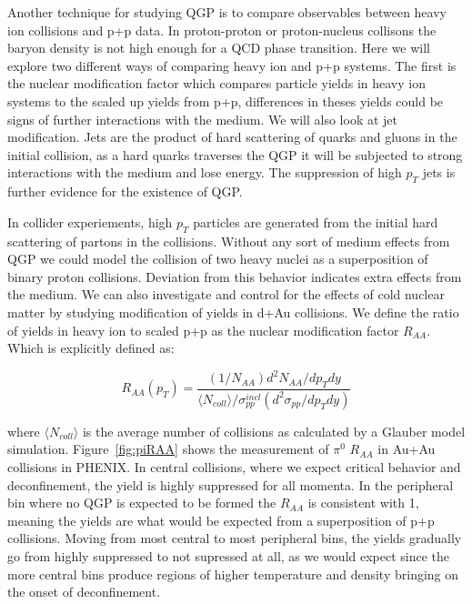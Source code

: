 Another technique for studying QGP is to compare observables between heavy ion collisions and p+p data. In proton-proton or proton-nucleus collisons the baryon density is not high enough for a QCD phase transition. Here we will explore two different ways of comparing heavy ion and p+p systems. The first is the nuclear modification factor which compares particle yields in  heavy ion systems to the scaled up yields from p+p, differences in theses yields could be signs of further interactions with the medium. We will also look at jet modification. Jets are the product of hard scattering of quarks and gluons in the initial collision, as a hard quarks traverses the QGP it will be subjected to strong interactions with the medium and lose energy. The suppression of high $p_T$ jets is further evidence for the existence of QGP.

In collider experiements, high $p_T$ particles are generated from the initial hard scattering of partons in the collisions. Without any sort of medium effects from QGP we could model the collision of two heavy nuclei as a superposition of binary proton collisions. Deviation from this behavior indicates extra effects from the medium. We can also investigate and control for the effects of cold nuclear matter by studying modification of yields in d+Au collisions. We define the ratio of yields in heavy ion to scaled p+p as the nuclear modification factor $R_{AA}$. Which is explicitly defined as:

\begin{equation}\label{eq:RAAdef}
R_{AA}(p_T) = \frac{(1/N_{AA}) d^2N_{AA}/dp_Tdy}{\langle N_{coll} \rangle/\sigma^{incl}_{pp}(d^2\sigma_{pp}/dp_Tdy)} 
\end{equation}

where $ \langle N_{coll} \rangle $ is the average number of collisions as calculated by a Glauber model simulation. Figure~\ref{fig:piRAA} shows the measurement of $\pi^0$ $ R_{AA}$ in Au+Au collisions in PHENIX. In central collisions, where we expect critical behavior and deconfinement, the yield is highly suppressed for all momenta. In the peripheral bin where no QGP is expected to be formed the $R_{AA}$ is consistent with 1, meaning the yields are what would be expected from a superposition of p+p collisions. Moving from most central to most peripheral bins, the yields gradually go from highly suppressed to not supressed at all, as we would expect since the more central bins produce regions of higher temperature and density bringing on the onset of deconfinement.


